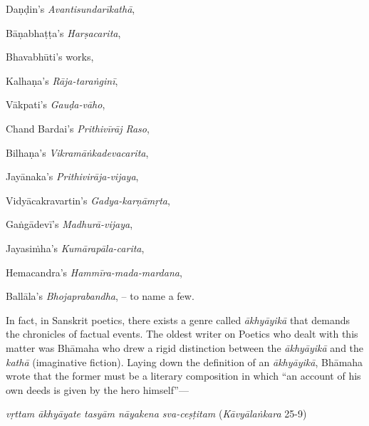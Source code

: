Daṇḍin’s {\sl Avantisundarīkathā}, 

Bāṇabhaṭṭa’s {\sl Harṣacarita},

Bhavabhūti's works,

Kalhaṇa’s {\sl Rāja-taraṅginī}, 

Vākpati’s {\sl Gauḍa-vāho}, 

Chand Bardai’s {\sl Prithivīrāj Raso}, 

Bilhaṇa’s {\sl Vikramāṅkadevacarita}, 

Jayānaka’s {\sl Prithivirāja-vijaya}, 

Vidyācakravartin’s {\sl Gadya-karṇāmṛta}, 

Gaṅgā\-devī’s {\sl Madhurā-vijaya}, 

Jayasiṁha’s {\sl Kumārapāla-carita}, 

Hemacandra’s {\sl Hammīra-mada-mardana}, 

Ballāla’s {\sl Bhojaprabandha}, -- to name a few. 

In fact, in Sanskrit poetics, there exists a genre called {\sl ākhyāyikā} that demands the chronicles of factual events. The oldest writer on Poetics who dealt with this matter was Bhāmaha who drew a rigid distinction between the {\sl ākhyāyikā} and the {\sl kathā} (imaginative fiction). Laying down the definition of an {\sl ākhyāyikā}, Bhāmaha wrote that the former must be a literary composition in which “an account of his own deeds is given by the hero himself”— 

{\sl vṛttam ākhyāyate tasyām nāyakena sva-ceṣṭitam} 	          \hfill{({\sl Kāvyālaṅkara} 25-9)}

